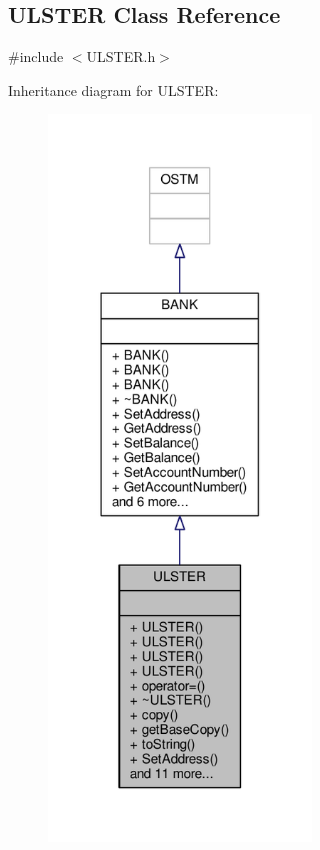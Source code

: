 \hypertarget{class_u_l_s_t_e_r}{}\subsection{U\+L\+S\+T\+ER Class Reference}
\label{class_u_l_s_t_e_r}


{\ttfamily \#include $<$U\+L\+S\+T\+E\+R.\+h$>$}



Inheritance diagram for U\+L\+S\+T\+ER\+:
\nopagebreak
\begin{figure}[H]
\begin{center}
\leavevmode
\includegraphics[width=198pt]{class_u_l_s_t_e_r__inherit__graph}
\end{center}
\end{figure}


